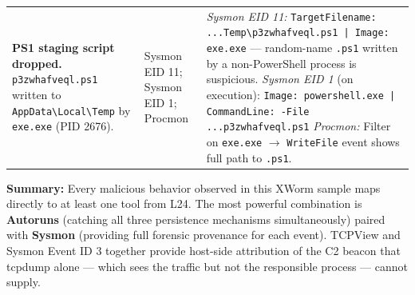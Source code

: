 \documentclass[10pt]{article}
\begin{document}
\begin{longtable}{>{\raggedright\arraybackslash}p{3.8cm}
                  >{\raggedright\arraybackslash}p{2.8cm}
                  >{\raggedright\arraybackslash}p{8.4cm}}
\textbf{PS1 staging script dropped.}
\texttt{p3zwhafveql.ps1} written to \texttt{AppData\textbackslash Local\textbackslash Temp} by \texttt{exe.exe} (PID 2676).
&
Sysmon EID 11; Sysmon EID 1; Procmon
&
\textit{Sysmon EID 11:} \texttt{TargetFilename: ...Temp\textbackslash p3zwhafveql.ps1 | Image: exe.exe} --- random-name \texttt{.ps1} written by a non-PowerShell process is suspicious.
\textit{Sysmon EID 1} (on execution): \texttt{Image: powershell.exe | CommandLine: -File ...p3zwhafveql.ps1}
\textit{Procmon:} Filter on \texttt{exe.exe} $\to$ \texttt{WriteFile} event shows full path to \texttt{.ps1}. \\
 
\end{longtable}
 
\vspace{1em}
\noindent\textbf{Summary:} Every malicious behavior observed in this XWorm sample maps
directly to at least one tool from L24. The most powerful combination is
\textbf{Autoruns} (catching all three persistence mechanisms simultaneously) paired
with \textbf{Sysmon} (providing full forensic provenance for each event). TCPView and
Sysmon Event ID 3 together provide host-side attribution of the C2 beacon that
tcpdump alone --- which sees the traffic but not the responsible process --- cannot
supply.
\end{document}
